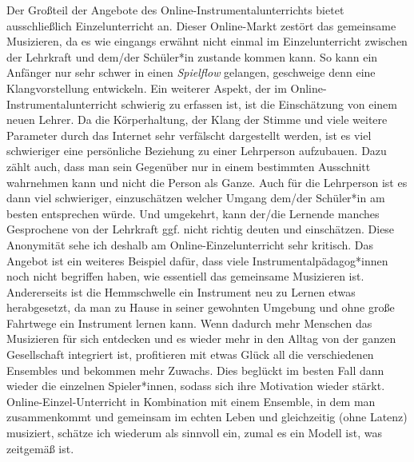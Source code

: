 Der Großteil der Angebote des Online-Instrumentalunterrichts bietet
ausschließlich Einzelunterricht an. Dieser Online-Markt zestört das gemeinsame
Musizieren, da es wie eingangs erwähnt nicht einmal im Einzelunterricht zwischen
der Lehrkraft und dem/der Schüler*in zustande kommen kann. So kann ein Anfänger
nur sehr schwer in einen \emph{Spielflow} gelangen, geschweige denn eine
Klangvorstellung entwickeln. Ein weiterer Aspekt, der im
Online-Instrumentalunterricht schwierig zu erfassen ist, ist die Einschätzung
von einem neuen Lehrer. Da die Körperhaltung, der Klang der Stimme und viele
weitere Parameter durch das Internet sehr verfälscht dargestellt werden, ist es viel
schwieriger eine persönliche Beziehung zu einer Lehrperson aufzubauen. Dazu
zählt auch, dass man sein Gegenüber nur in einem bestimmten Ausschnitt
wahrnehmen kann und nicht die Person als Ganze. Auch für die Lehrperson ist es
dann viel schwieriger, einzuschätzen welcher Umgang dem/der Schüler*in am besten
entsprechen würde. Und umgekehrt, kann der/die Lernende manches Gesprochene von
der Lehrkraft ggf. nicht richtig deuten und einschätzen. Diese Anonymität
sehe ich deshalb am Online-Einzelunterricht sehr kritisch. Das Angebot ist ein
weiteres Beispiel dafür, dass viele Instrumentalpädagog*innen noch nicht
begriffen haben, wie essentiell das gemeinsame Musizieren ist. Andererseits ist
die Hemmschwelle ein Instrument neu zu Lernen etwas herabgesetzt, da man zu
Hause in seiner gewohnten Umgebung und ohne große Fahrtwege ein Instrument
lernen kann. Wenn dadurch mehr Menschen das Musizieren für sich entdecken und es
wieder mehr in den Alltag von der ganzen Gesellschaft integriert ist,
profitieren mit etwas Glück all die verschiedenen Ensembles und bekommen mehr
Zuwachs. Dies beglückt im besten Fall dann wieder die einzelnen Spieler*innen,
sodass sich ihre Motivation wieder stärkt. Online-Einzel-Unterricht in
Kombination mit einem Ensemble, in dem man zusammenkommt und gemeinsam im echten
Leben und gleichzeitig (ohne Latenz) musiziert, schätze ich wiederum als
sinnvoll ein, zumal es ein Modell ist, was zeitgemäß ist. 

